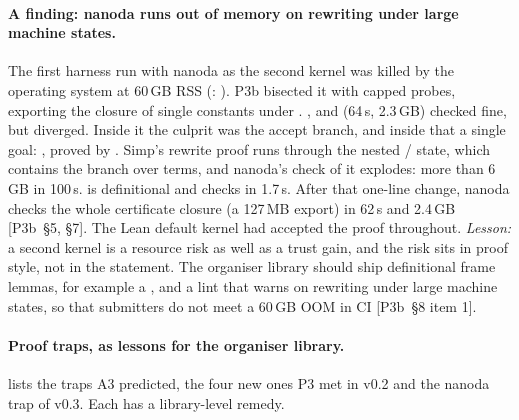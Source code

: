 \paragraph{A finding: nanoda runs out of memory on  rewriting under large machine
states.} The first harness run with nanoda as the second kernel was killed by the operating system
at 60\,GB RSS (: ). P3b
bisected it with capped probes, exporting the closure of single constants under .
,  and  (64\,s, 2.3\,GB) checked fine, but
 diverged. Inside it the culprit was the accept branch, and inside that a single goal:
, proved by . Simp's rewrite proof runs through the nested
/ state, which contains the branch  over  terms, and
nanoda's check of it explodes: more than 6\,GB in 100\,s.  is definitional and checks
in 1.7\,s. After that one-line change, nanoda checks the whole certificate closure (a 127\,MB export)
in 62\,s and 2.4\,GB [P3b~§5, §7]. The Lean default kernel had accepted the  proof
throughout. \emph{Lesson:} a second kernel is a resource risk as well as a trust gain, and the risk
sits in proof style, not in the statement. The organiser library should ship definitional frame
lemmas, for example a , and a lint that warns on  rewriting under
large machine states, so that submitters do not meet a 60\,GB OOM in CI [P3b~§8 item 1].

\paragraph{Proof traps, as lessons for the organiser library.}  lists the traps
A3 predicted, the four new ones P3 met in v0.2 and the nanoda trap of v0.3. Each has a library-level
remedy.

